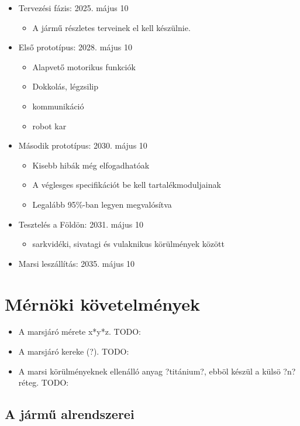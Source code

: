 \documentclass[12pt]{report}
\begin{document}
\begin{itemize}
  \item Tervezési fázis: 2025. május 10
  \begin{itemize}
    \item A jármű részletes terveinek el kell készülnie.
  \end{itemize}
  \item Első prototípus: 2028. május 10
  \begin{itemize}
    \item Alapvető motorikus funkciók
    \item Dokkolás, légzsilip
    \item kommunikáció
    \item robot kar
  \end{itemize}
  \item Második prototípus: 2030. május 10
  \begin{itemize}
    \item Kisebb hibák még elfogadhatóak
    \item A véglesges specifikációt be kell tartalékmoduljainak
    \item Legalább 95\%-ban legyen megvalósítva
  \end{itemize}
  \item Tesztelés a Földön: 2031. május 10
  \begin{itemize}
    \item sarkvidéki, sivatagi és vulaknikus körülmények között
  \end{itemize}
  \item Marsi leszállítás: 2035. május 10
\end{itemize}


\section{Mérnöki követelmények}
\begin{itemize}
  \item A marsjáró mérete x*y*z. TODO:
  \item A marsjáró kereke (?). TODO:
  \item A marsi körülményeknek ellenálló anyag ?titánium?, ebböl készül a külsö ?n? réteg. TODO:
\end{itemize}

\subsection{A jármű alrendszerei}\label{subsystems}
\end{document}
